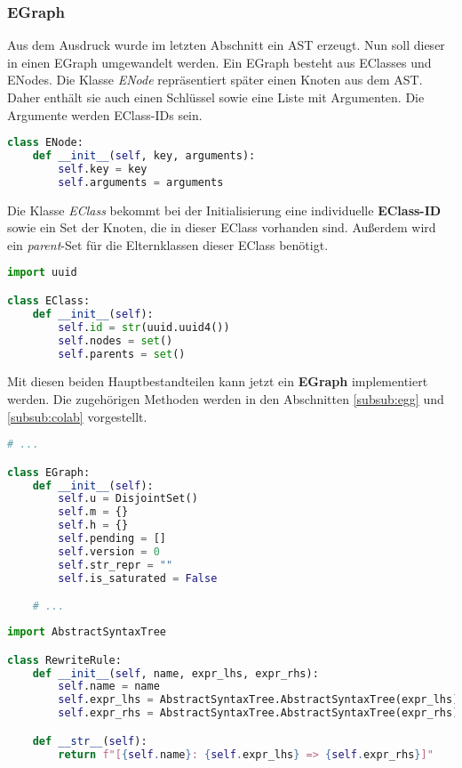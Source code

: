 \subsubsection{EGraph}

Aus dem Ausdruck wurde im letzten Abschnitt ein AST erzeugt. Nun soll dieser in einen EGraph umgewandelt werden. Ein EGraph besteht aus EClasses und ENodes.
Die Klasse \textit{ENode} repräsentiert später einen Knoten aus dem AST. Daher enthält sie auch einen Schlüssel sowie eine Liste mit Argumenten. Die Argumente werden 
EClass-IDs sein.

\begin{lstlisting}[language=Python, caption=Klasse \textit{ENode}]
class ENode:
    def __init__(self, key, arguments):
        self.key = key
        self.arguments = arguments
\end{lstlisting}

Die Klasse \textit{EClass} bekommt bei der Initialisierung eine individuelle \textbf{EClass-ID} sowie ein Set der Knoten, die in dieser EClass vorhanden sind. Außerdem
wird ein \textit{parent}-Set für die Elternklassen dieser EClass benötigt.

\begin{lstlisting}[language=Python, caption=Klasse \textit{EClass}]
import uuid

class EClass:
    def __init__(self):
        self.id = str(uuid.uuid4())
        self.nodes = set()
        self.parents = set()
\end{lstlisting}

Mit diesen beiden Hauptbestandteilen kann jetzt ein \textbf{EGraph} implementiert werden. 
Die zugehörigen Methoden werden in den Abschnitten \ref{subsub:egg} und \ref{subsub:colab} vorgestellt.

\begin{lstlisting}[language=Python, caption=Klasse \textit{EGraph}]
# ... 

class EGraph:
    def __init__(self):
        self.u = DisjointSet()
        self.m = {}
        self.h = {}
        self.pending = []
        self.version = 0
        self.str_repr = ""
        self.is_saturated = False

    # ...
\end{lstlisting} 


\begin{lstlisting}[language=Python, caption=Klasse \textit{RewriteRule}]
import AbstractSyntaxTree

class RewriteRule:
    def __init__(self, name, expr_lhs, expr_rhs):
        self.name = name
        self.expr_lhs = AbstractSyntaxTree.AbstractSyntaxTree(expr_lhs)
        self.expr_rhs = AbstractSyntaxTree.AbstractSyntaxTree(expr_rhs)

    def __str__(self):
        return f"[{self.name}: {self.expr_lhs} => {self.expr_rhs}]"
\end{lstlisting}



